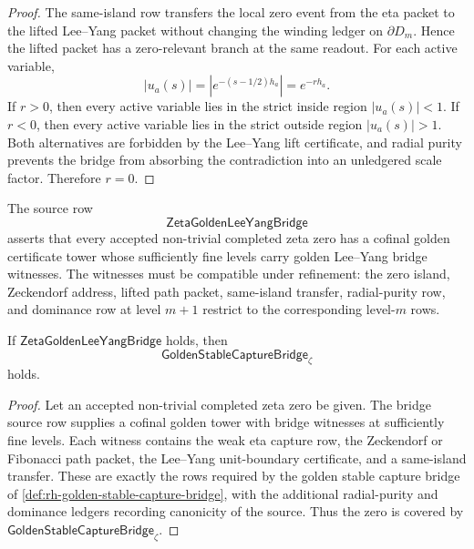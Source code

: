 \begin{proof}
The same-island row transfers the local zero event from the eta packet
to the lifted Lee--Yang packet without changing the winding ledger on
$\partial D_m$.  Hence the lifted packet has a zero-relevant branch at
the same readout.  For each active variable,
$$
|u_a(s)|
=
\left|e^{-(s-1/2)h_a}\right|
=
e^{-rh_a}.
$$
If $r>0$, then every active variable lies in the strict inside region
$|u_a(s)|<1$.  If $r<0$, then every active variable lies in the strict
outside region $|u_a(s)|>1$.  Both alternatives are forbidden by the
Lee--Yang lift certificate, and radial purity prevents the bridge from
absorbing the contradiction into an unledgered scale factor.  Therefore
$r=0$.
\end{proof}

\begin{definition}
\label{def:rh-zeta-golden-lee-yang-bridge-source-row}
The source row
$$
\mathsf{ZetaGoldenLeeYangBridge}
$$
asserts that every accepted non-trivial completed zeta zero has a
cofinal golden certificate tower whose sufficiently fine levels carry
golden Lee--Yang bridge witnesses.  The witnesses must be compatible
under refinement: the zero island, Zeckendorf address, lifted path
packet, same-island transfer, radial-purity row, and dominance row at
level $m+1$ restrict to the corresponding level-$m$ rows.
\end{definition}

\begin{theorem}
\label{thm:rh-golden-bridge-source-row-gives-stable-capture}
If $\mathsf{ZetaGoldenLeeYangBridge}$ holds, then
$$
\mathsf{GoldenStableCaptureBridge}_{\zeta}
$$
holds.
\end{theorem}

\begin{proof}
Let an accepted non-trivial completed zeta zero be given.  The bridge
source row supplies a cofinal golden tower with bridge witnesses at
sufficiently fine levels.  Each witness contains the weak eta capture
row, the Zeckendorf or Fibonacci path packet, the Lee--Yang
unit-boundary certificate, and a same-island transfer.  These are exactly
the rows required by the golden stable capture bridge of
\autoref{def:rh-golden-stable-capture-bridge}, with the additional
radial-purity and dominance ledgers recording canonicity of the source.
Thus the zero is covered by
$\mathsf{GoldenStableCaptureBridge}_{\zeta}$.
\end{proof}

